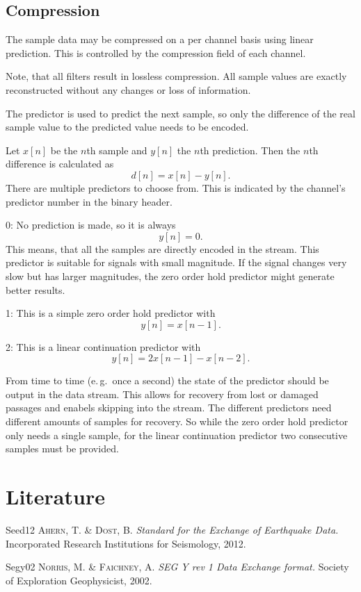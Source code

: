 \documentclass[DIV=10]{scrartcl}
\newcommand\litref[1]{\textref{[#1]}}
\newenvironment{refliterature}
{\list{}{
  \setlength{\leftmargin}{45pt}
  \setlength{\labelwidth}{45pt}
  \setlength{\labelsep}{0pt}
  \setlength{\itemindent}{0pt}
  \setlength{\itemsep}{-2pt}
  \let\makelabel\litref
}\RaggedRight}
{\endlist}
\begin{document}
\subsection{Compression}
\label{compression}

The sample data may be compressed on a per channel basis using linear prediction.
This is controlled by the compression field of each channel.

Note, that all filters result in lossless compression.
All sample values are exactly reconstructed without any changes or loss of information.

The predictor is used to predict the next sample, so only the difference of the real sample value to the predicted value needs to be encoded.

Let \(x[n]\) be the \(n\)th sample and \(y[n]\) the \(n\)th prediction.
Then the \(n\)th difference is calculated as
\[
  d[n] = x[n] - y[n].
\]
There are multiple predictors to choose from.
This is indicated by the channel’s predictor number in the binary header.

0: No prediction is made, so it is always
\[
  y[n] = 0.
\]
This means, that all the samples are directly encoded in the stream.
This predictor is suitable for signals with small magnitude.
If the signal changes very slow but has larger magnitudes, the zero order hold predictor might generate better results.

1: This is a simple zero order hold predictor with
\[
  y[n] = x[n - 1].
\]

2: This is a linear continuation predictor with
\[
  y[n] = 2x[n - 1] - x[n - 2].
\]

From time to time (e.\,g.\ once a second) the state of the predictor should be output in the data stream.
This allows for recovery from lost or damaged passages and enabels skipping into the stream.
The different predictors need different amounts of samples for recovery.
So while the zero order hold predictor only needs a single sample, for the linear continuation predictor two consecutive samples must be provided.

\section{Literature}

\begin{refliterature}
\item[Seed12] \textsc{Ahern, T. \& Dost, B.} \textit{Standard for the Exchange of Earthquake Data.} Incorporated Research Institutions for Seismology, 2012.
\item[Segy02] \textsc{Norris, M. \& Faichney, A.} \textit{SEG Y rev 1 Data Exchange format.} Society of Exploration Geophysicist, 2002.
\end{refliterature}
\end{document}
